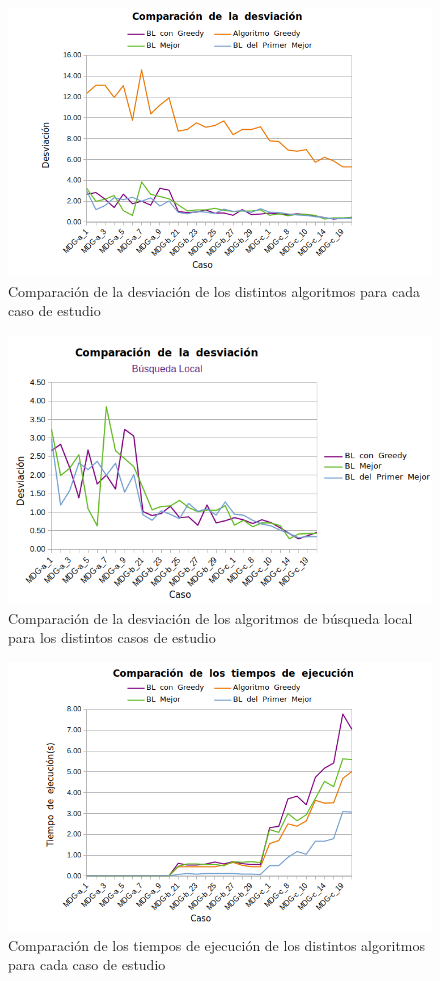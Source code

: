 \documentclass[11pt,a4paper]{article}
\begin{document}
\begin{figure}[H]
	\centering
	\includegraphics[width=0.9\linewidth]{img/comp_dev}
	\caption{Comparación de la desviación  de los distintos algoritmos para cada caso de estudio}
	\label{fig:compdev}
\end{figure}

\begin{figure}[H]
	\centering
	\includegraphics[width=0.9\linewidth]{img/comp_dev_bl}
	\caption{Comparación de la desviación  de los algoritmos de búsqueda local para los distintos casos de estudio}
	\label{fig:compdevbl}
\end{figure}

\begin{figure}[H]
	\centering
	\includegraphics[width=0.9\linewidth]{img/comp_tiempo}
	\caption{Comparación de los tiempos de ejecución de los distintos algoritmos para cada caso de estudio}
	\label{fig:comptiempo}
\end{figure}
\end{document}
